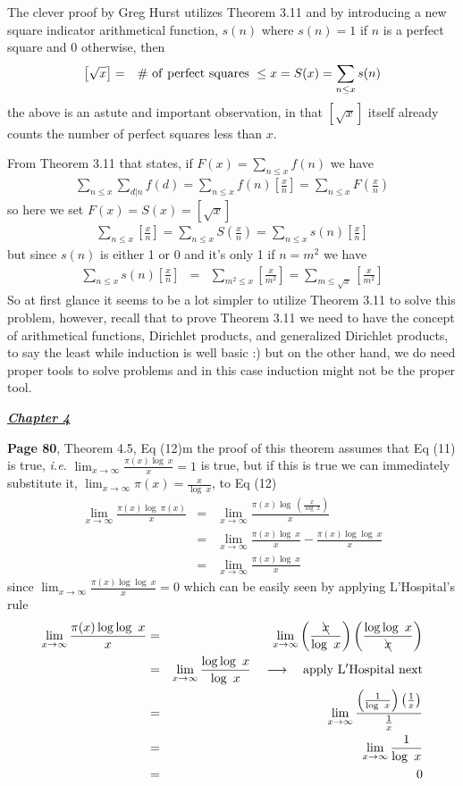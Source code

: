 \documentclass[aps,preprint,preprintnumbers,nofootinbib,showpacs,prd]{revtex4-1}
\newcommand{\ie}{{\it i.e.} }
\newcommand{\nbea}{\begin{eqnarray*}}
\newcommand{\neea}{\end{eqnarray*}}
\begin{document}
The clever proof by Greg Hurst utilizes Theorem 3.11 and by introducing a new square indicator arithmetical function, $s(n)$ where $s(n)=1$ if $n$ is a perfect square and $0$ otherwise, then
%
\nbea
\left \lbrack \sqrt{x} \right \rbrack & = & \# {\rm~of~perfect~squares~} \le x = S(x) = \sum_{n\le x}s(n)
\neea
%
the above is an astute and important observation, in that $\left\lbrack \sqrt{x}\right\rbrack$ itself already counts the number of perfect squares less than $x$.

From Theorem 3.11 that states, if $F(x) = \sum_{n \le x} f(n)$ we have
%
\nbea
\sum_{n\le x}\sum_{d|n} f(d) = \sum_{n\le x} f(n)\left\lbrack\frac{x}{n}\right\rbrack = \sum_{n\le x}F\left (\frac{x}{n}\right )
\neea
%
so here we set $F(x) = S(x) = \left\lbrack\sqrt{x}\right\rbrack$
%
\nbea
\sum_{n\le x} \left \lbrack \frac{x}{n}\right \rbrack = \sum_{n\le x}S\left (\frac{x}{n}\right ) = \sum_{n\le x} s(n) \left \lbrack\frac{x}{n} \right\rbrack
\neea
%
but since $s(n)$ is either 1 or 0 and it's only 1 if $n=m^2$ we have 
%
\nbea
\sum_{n\le x} s(n) \left \lbrack\frac{x}{n} \right\rbrack & = & \sum_{m^2\le x} \left\lbrack \frac{x}{m^2}\right \rbrack = \sum_{m\le \sqrt{x}} \left\lbrack \frac{x}{m^2}\right \rbrack
\neea
%
So at first glance it seems to be a lot simpler to utilize Theorem 3.11 to solve this problem, however, recall that to prove Theorem 3.11 we need to have the concept of arithmetical functions, Dirichlet products, and generalized Dirichlet products, to say the least while induction is well basic :) but on the other hand, we do need proper tools to solve problems and in this case induction might not be the proper tool.

\bigskip
\underline{\textbf{\textit{Chapter 4}}}
\bigskip

{\bf Page 80}, Theorem 4.5, Eq (12)m the proof of this theorem assumes that Eq (11) is true, \ie $\lim_{x\to\infty} \frac{\pi(x)\log~x}{x} = 1$ is true, but if this is true we can immediately substitute it, $\lim_{x\to\infty} \pi(x) = \frac{x}{\log~x}$, to Eq (12)
%
\nbea
\lim_{x\to\infty} \frac{\pi(x)\log~\pi(x)}{x} & = & \lim_{x\to\infty} \frac{\pi(x)\log~\left (\frac{x}{\log~x} \right )}{x} \\
& = & \lim_{x\to\infty} \frac{\pi(x)\log~x}{x} - \frac{\pi(x)\log \log~x}{x} \\
& = & \lim_{x\to\infty} \frac{\pi(x)\log~x}{x}
\neea
%
since $\lim_{x\to\infty} \frac{\pi(x)\log \log~x}{x} = 0$ which can be easily seen by applying L'Hospital's rule
%
\nbea
\lim_{x\to\infty} \frac{\pi(x)\log \log~x}{x} & = & \lim_{x\to\infty} \left (\frac{\bcancel{x}}{\log~x}\right ) \left (\frac{\log \log~x}{\bcancel{x}}\right ) \\
& = & \lim_{x\to\infty} \frac{\log \log~x}{\log~x} ~~~\longrightarrow ~~~{\rm apply~L'Hospital~next}\\
& = & \lim_{x\to\infty}\frac{\left(\frac{1}{\log~x}\right)\left(\frac{1}{x}\right)}{\frac{1}{x}} \\
& = & \lim_{x\to\infty}\frac{1}{\log~x} \\
& = & 0
\neea
%
\end{document}
